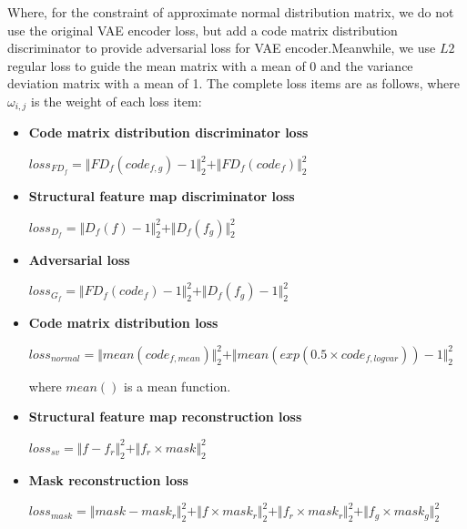 \documentclass[letterpaper]{article} %
\begin{document}
Where, for the constraint of approximate normal distribution matrix, we do not use the original VAE encoder loss, but add a code matrix distribution discriminator to provide adversarial loss for VAE encoder.Meanwhile, we use $L2$ regular loss to guide the mean matrix with a mean of 0 and the variance deviation matrix with a mean of 1.
The complete loss items are as follows, where $\omega_{i,j}$ is the weight of each loss item: 
\begin{itemize}
	\item \textbf{Code matrix distribution discriminator loss} 
	\begin{center}
		$loss_{FD_f}=\Vert{FD_f(code_{f,g})-1}\Vert_{2}^{2}+\Vert{FD_f(code_f)}\Vert_{2}^{2}$
	\end{center}
	
	\item \textbf{Structural feature map discriminator loss} 
	\begin{center}
		$loss_{D_f}=\Vert{D_f(f)-1}\Vert_{2}^{2}+\Vert{D_f(f_g )}\Vert_{2}^{2}$
	\end{center}
	
	\item \textbf{Adversarial loss} 
	\begin{center}
		$loss_{G_f}=\Vert{FD_f(code_f)-1}\Vert_{2}^{2}+\Vert{D_f(f_g)-1}\Vert_{2}^{2}$
	\end{center}
	
	\item \textbf{Code matrix distribution loss } 
	\begin{center}
		$loss_{normal}=\Vert{mean(code_{f,mean})}\Vert_{2}^{2}+ \Vert{mean(exp(0.5\times code_{f,logvar}))-1}\Vert_{2}^{2}$
	\end{center}
	where $mean()$ is a mean function.
	
	\item \textbf{Structural feature map reconstruction loss} 
	\begin{center}
		$loss_{sv}=\Vert{f-f_r}\Vert_{2}^{2}+\Vert{f_r\times mask}\Vert_{2}^{2}$
	\end{center}
	
	\item \textbf{Mask reconstruction loss}
	\begin{center}
		$loss_{mask}=\Vert{mask-mask_r }\Vert_{2}^{2}+\Vert{f\times mask_r}\Vert_{2}^{2}+\Vert{f_r\times mask_r}\Vert_{2}^{2}+\Vert{f_g\times mask_g}\Vert_{2}^{2}$
	\end{center}
\end{itemize}
\end{document}
